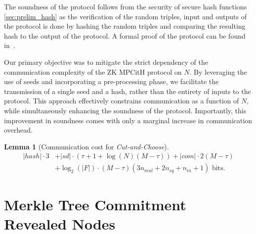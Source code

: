 \documentclass[11pt]{report}
\theoremstyle{definition}
\theoremstyle{plain}
\newtheorem{lemma}{Lemma}[section]
\begin{document}
The soundness of the protocol follows from the security of secure hash functions \autoref{sec:prelim_hash} as the verification of the random triples, input and outputs of the protocol is done by hashing the random triples and comparing the resulting hash to the output of the protocol. A formal proof of the protocol can be found in~\cite[p9]{baum2020concretely}.

Our primary objective was to mitigate the strict dependency of the communication complexity of the ZK MPCitH protocol on $N$. By leveraging the use of seeds and incorporating a pre-processing phase, we facilitate the transmission of a single seed and a hash, rather than the entirety of inputs to the protocol. This approach effectively constrains communication as a function of $N$, while simultaneously enhancing the soundness of the protocol. Importantly, this improvement in soundness comes with only a marginal increase in communication overhead.

\begin{lemma}[Communication cost for \textit{Cut-and-Choose}]
  \begin{align*}
    |hash| \cdot 3 & + |sd| \cdot (\tau + 1 + \log(N) (M - \tau )) + |com| \cdot 2(M - \tau )      \\
                   & + \log_2(|F|) \cdot (M - \tau )(3n_{mul} + 2n_{sq} + n_{in} + 1)\text{ bits.}
  \end{align*}
\end{lemma}


\section{Merkle Tree Commitment Revealed Nodes}\label{sub:merkle_tree_revealed_nodes}
\end{document}
